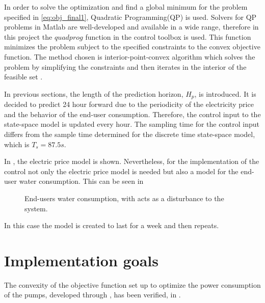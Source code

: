 In order to solve the optimization and find a global minimum for the problem specified in \eqref{eq:obj_final1},  Quadratic Programming(QP) is used. Solvers for QP problems in Matlab are well-developed and available in a wide range, therefore in this project the $quadprog$ function in the control toolbox is used. This function minimizes the problem subject to the specified constraints to the convex objective function. The method chosen is interior-point-convex algorithm which solves the problem by simplifying the constraints and then iterates in the interior of the feasible set \cite{Convex_optimization}. 

In previous sections, the length of the prediction horizon, $H_p$, is introduced. It is decided to predict 24 hour forward due to the periodicity of the electricity price and the behavior of the end-user consumption. Therefore, the control input to the state-space model is updated every hour. The sampling time for the control input differs from the sample time determined for the discrete time state-space model, which is $T_s = 87.5s$. 

In , the electric price model is shown. Nevertheless, for the implementation of the control not only the electric price model is needed but also a model for the end-user water consumption. This can be seen in 

\begin{figure}[H]
\centering
 
\caption{End-users water consumption, with acts as a disturbance to the system.}
\label{fig:water_consumption}
\end{figure}

In this case the model is created to last for a week and then repeats. 


\section{Implementation goals}
The convexity of the objective function set up to optimize the power consumption of the pumps, developed through , has been verified, in . 


